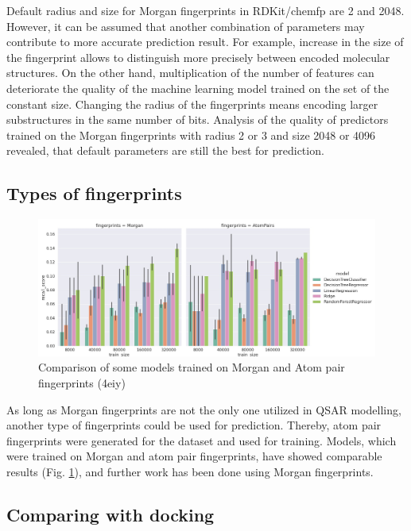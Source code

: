 Default radius and size for Morgan fingerprints in RDKit/chemfp are 2 and 2048.
However, it can be assumed that another combination of parameters may contribute to more accurate prediction result.
For example, increase in the size of the fingerprint allows to distinguish more precisely between encoded molecular structures. On the other hand, multiplication of the number of features can deteriorate the quality of the machine learning model trained on the set of the constant size.
Changing the radius of the fingerprints means encoding larger substructures  in the same number of bits.
Analysis of the quality of predictors trained on the Morgan fingerprints with radius 2 or 3 and size 2048 or 4096 revealed, that default parameters are still the best for prediction.
\hfill\break
\subsection{Types of fingerprints}

\begin{figure}[H]
    \centering
    \includegraphics[width=\linewidth]{Images/MorganVSAtomPairs.jpg}
    \caption{Comparison of some models trained on Morgan and Atom pair fingerprints (4eiy)}
    \label{MvsAP}
\end{figure}

As long as Morgan fingerprints are not the only one utilized in QSAR modelling, another type of fingerprints could be used for prediction. 
Thereby, atom pair fingerprints were generated for the dataset and used for training. 
Models, which were trained on Morgan and atom pair fingerprints, have showed comparable results (Fig. \ref{MvsAP}), and further work has been done using Morgan fingerprints.

\hfill\break
\subsection{Comparing with docking}

